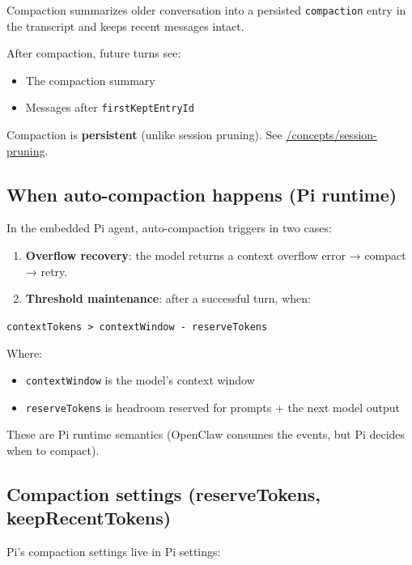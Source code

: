 Compaction summarizes older conversation into a persisted \texttt{compaction} entry in the transcript and keeps recent messages intact.

After compaction, future turns see:

\begin{itemize}
  \item The compaction summary
  \item Messages after \texttt{firstKeptEntryId}
\end{itemize}


Compaction is \textbf{persistent} (unlike session pruning). See \href{/concepts/session-pruning}{/concepts/session-pruning}.

\hrulefill


\subsection{When auto-compaction happens (Pi runtime)}


In the embedded Pi agent, auto-compaction triggers in two cases:

\begin{enumerate}
  \item \textbf{Overflow recovery}: the model returns a context overflow error → compact → retry.
  \item \textbf{Threshold maintenance}: after a successful turn, when:
\end{enumerate}


\texttt{contextTokens > contextWindow - reserveTokens}

Where:

\begin{itemize}
  \item \texttt{contextWindow} is the model’s context window
  \item \texttt{reserveTokens} is headroom reserved for prompts + the next model output
\end{itemize}


These are Pi runtime semantics (OpenClaw consumes the events, but Pi decides when to compact).

\hrulefill


\subsection{Compaction settings (reserveTokens, keepRecentTokens)}


Pi’s compaction settings live in Pi settings:

